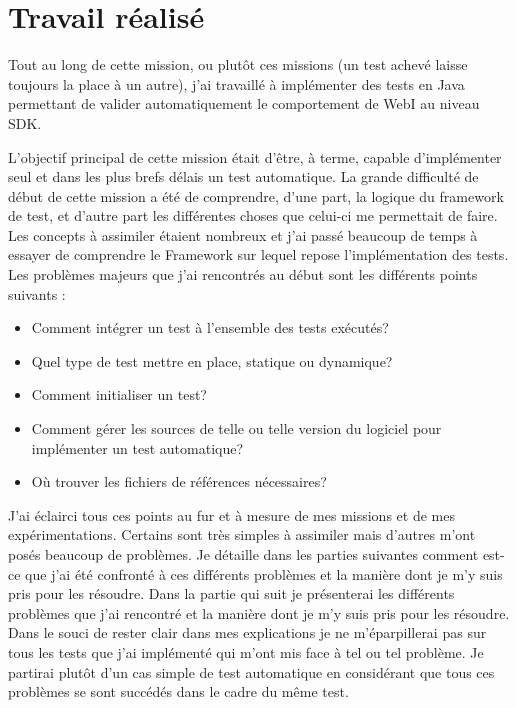 \section{Travail r\'{e}alis\'{e}}

Tout au long de cette mission, ou plut\^{o}t ces missions (un test achev\'{e} laisse toujours la place \`{a} un autre), j'ai travaill\'{e} \`{a} impl\'{e}menter des tests en Java permettant de valider automatiquement le comportement de WebI au niveau SDK.

L'objectif principal de cette mission \'{e}tait d'\^{e}tre, \`{a} terme, capable d'impl\'{e}menter seul et dans les plus brefs d\'{e}lais un test automatique. La grande difficult\'{e} de d\'{e}but de cette mission a \'{e}t\'{e} de comprendre, d'une part, la logique du framework de test, et d'autre part les diff\'{e}rentes choses que celui-ci me permettait de faire.\\

Les concepts \`{a} assimiler \'{e}taient nombreux et j'ai pass\'{e} beaucoup de temps \`{a} essayer de comprendre le Framework sur lequel repose l'impl\'{e}mentation des tests. Les probl\`{e}mes majeurs que j'ai rencontr\'{e}s au d\'{e}but sont les diff\'{e}rents points suivants :
\begin{itemize}
	\item Comment int\'{e}grer un test \`{a} l'ensemble des tests ex\'{e}cut\'{e}s?
  \item Quel type de test mettre en place, statique ou dynamique?
	\item Comment initialiser un test?
	\item Comment g\'{e}rer les sources de telle ou telle version du logiciel pour impl\'{e}menter un test automatique?
	\item O\`{u} trouver les fichiers de r\'{e}f\'{e}rences n\'{e}cessaires?
\end{itemize}

J'ai \'{e}clairci tous ces points au fur et \`{a} mesure de mes missions et de mes exp\'{e}rimentations. Certains sont tr\`{e}s simples \`{a} assimiler mais d'autres m'ont pos\'{e}s beaucoup de probl\`{e}mes. Je d\'{e}taille dans les parties suivantes comment est-ce que j'ai \'{e}t\'{e} confront\'{e} \`{a} ces diff\'{e}rents probl\`{e}mes et la mani\`{e}re dont je m'y suis pris pour les r\'{e}soudre. Dans la partie qui suit je pr\'{e}senterai les diff\'{e}rents probl\`{e}mes que j'ai rencontr\'{e} et la mani\`{e}re dont je m'y suis pris pour les r\'{e}soudre. Dans le souci de rester clair dans mes explications je ne m'\'{e}parpillerai pas sur tous les tests que j'ai impl\'{e}ment\'{e} qui m'ont mis face \`{a} tel ou tel probl\`{e}me. Je partirai plut\^{o}t d'un cas simple de test automatique en consid\'{e}rant que tous ces probl\`{e}mes se sont succ\'{e}d\'{e}s dans le cadre du m\^{e}me test.\\


